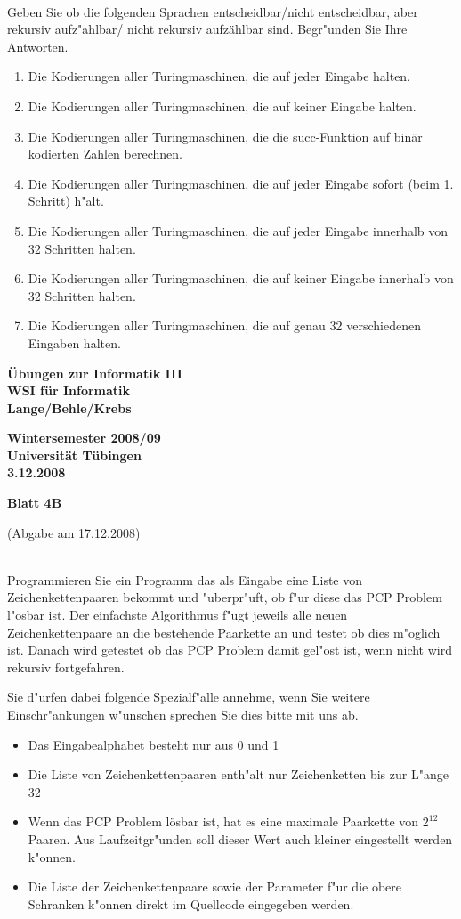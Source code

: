 \documentclass[a4paper]{article}
\def\header#1#2#3{\pagestyle{empty}
\noindent
\begin{minipage}[t]{0.6\textwidth}
\begin{flushleft}
\bf \"Ubungen zur Informatik III\\
WSI f\"ur Informatik\\
Lange/Behle/Krebs
\end{flushleft}
\end{minipage}
\begin{minipage}[t]{0.4\textwidth}
\begin{flushright}
\bf Wintersemester 2008/09\\
Universit\"at T\"ubingen\\
#2 %
\end{flushright}
\end{minipage}

\begin{center}
{\Large\bf Blatt #1}

{(Abgabe am #3)}
\end{center}
\bigskip
}
\begin{document}
\bigskip
{}\\
Geben Sie ob die folgenden Sprachen entscheidbar/nicht entscheidbar, aber rekursiv aufz"ahlbar/ nicht rekursiv aufz\"ahlbar sind. Begr"unden Sie Ihre Antworten.
\begin{enumerate}
\item Die Kodierungen aller Turingmaschinen, die auf jeder Eingabe halten.
\item Die Kodierungen aller Turingmaschinen, die auf keiner Eingabe halten.
\item Die Kodierungen aller Turingmaschinen, die die succ-Funktion auf bin\"ar kodierten Zahlen berechnen.
\item Die Kodierungen aller Turingmaschinen, die auf jeder Eingabe sofort (beim 1. Schritt) h"alt.
\item Die Kodierungen aller Turingmaschinen, die auf jeder Eingabe innerhalb von 32 Schritten halten.
\item Die Kodierungen aller Turingmaschinen, die auf keiner Eingabe innerhalb von 32 Schritten halten.
\item Die Kodierungen aller Turingmaschinen, die auf genau 32 verschiedenen Eingaben halten.
\end{enumerate}
\bigskip



\newpage
\header{4B}{3.12.2008}{17.12.2008}

\bigskip
{}\\

Programmieren Sie ein Programm das als Eingabe eine Liste von Zeichenkettenpaaren bekommt und "uberpr"uft, ob f"ur diese das PCP Problem l"osbar ist.
Der einfachste Algorithmus f"ugt jeweils alle neuen Zeichenkettenpaare an die bestehende Paarkette an und testet ob dies m"oglich ist. Danach wird getestet ob das PCP Problem damit gel"ost ist, wenn nicht wird rekursiv fortgefahren.

Sie d"urfen dabei folgende Spezialf"alle annehme, wenn Sie weitere Einschr"ankungen w"unschen sprechen Sie dies bitte mit uns ab.

\begin{itemize}
\item Das Eingabealphabet besteht nur aus 0 und 1
\item Die Liste von Zeichenkettenpaaren enth"alt nur Zeichenketten bis zur L"ange 32
\item Wenn das PCP Problem l\"osbar ist, hat es eine maximale Paarkette von $2^{12}$ Paaren. Aus Laufzeitgr"unden soll dieser Wert auch kleiner eingestellt werden k"onnen.
\item Die Liste der Zeichenkettenpaare sowie der Parameter f"ur die obere Schranken k"onnen direkt im Quellcode eingegeben werden.
\end{itemize}
\end{document}
